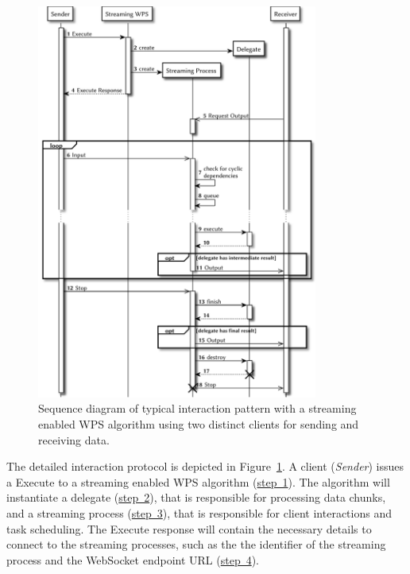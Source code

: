 	\begin{figure}[!htb]
		\centering
		\includegraphics[width=0.82253521126760565\textwidth]{figures/sequence-diagramm-swps.pdf}
		\caption{\label{fig:sd:swps}Sequence diagram of typical interaction pattern with a streaming enabled WPS algorithm using two distinct clients for sending and receiving data.}
	\end{figure}

	The detailed interaction protocol is depicted in Figure~\ref{fig:sd:swps}. A client (\emph{Sender}) issues a Execute to a streaming enabled WPS algorithm (\hyperref[fig:sd:swps]{step~1}). The algorithm will instantiate a delegate (\hyperref[fig:sd:swps]{step~2}), that is responsible for processing data chunks, and a streaming process (\hyperref[fig:sd:swps]{step~3}), that is responsible for client interactions and task scheduling. The Execute response will contain the necessary details to connect to the streaming processes, such as the the identifier of the streaming process and the WebSocket endpoint URL (\hyperref[fig:sd:swps]{step~4}).

